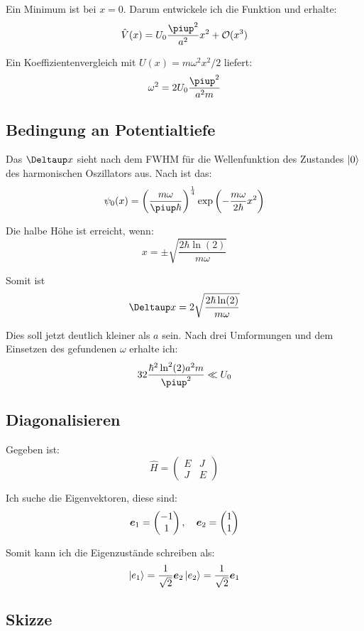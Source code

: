 Ein Minimum ist bei $x = 0$. Darum entwickele ich die Funktion und erhalte:
\[
	\hat V(x) = U_0 \frac{\piup^2}{a^2} x^2 + \mathcal O(x^3)
\]

Ein Koeffizientenvergleich mit $U(x) = m \omega^2 x^2/2$ liefert:
\[
	\omega^2 = 2 U_0 \frac{\piup^2}{a^2m}
\]

\subsection{Bedingung an Potentialtiefe}

Das $\Deltaup x$ sieht nach dem FWHM für die Wellenfunktion des Zustandes $\left| 0 \right\rangle$ des harmonischen Oszillators aus. Nach \cite[Übersichtsfolie 17]{kubis/physik421} ist das:
\[
	\psi_0(x) = \del{\frac{m \omega}{\piup \hbar}}^{\frac 14} \exp\del{-\frac{m\omega}{2\hbar} x^2}
\]

Die halbe Höhe ist erreicht, wenn:
\[
	x = \pm \sqrt{\frac{2\hbar \ln(2)}{m\omega}}
\]

Somit ist
\[
	\Deltaup x = 2 \sqrt{\frac{2\hbar \ln(2)}{m\omega}}
\]

Dies soll jetzt deutlich kleiner als $a$ sein. Nach drei Umformungen und dem
Einsetzen des gefundenen $\omega$ erhalte ich:
\[
	32 \frac{\hbar^2 \ln^2(2) a^2 m}{\piup^2} \ll U_0
\]

\subsection{Diagonalisieren}

Gegeben ist:
\[
	\hat H = \begin{pmatrix}
		E & J \\ J & E
	\end{pmatrix}
\]

Ich suche die Eigenvektoren, diese sind:
\[
	\boldsymbol{e}_1 = \begin{pmatrix}
		-1 \\ 1
	\end{pmatrix}
	,\quad
	\boldsymbol{e}_2 = \begin{pmatrix}
		1 \\ 1
	\end{pmatrix}
\]

Somit kann ich die Eigenzustände schreiben als:
\[
	\left| e_1 \right\rangle = \frac{1}{\sqrt{2}} \boldsymbol{e}_2 \\
	\left| e_2 \right\rangle = \frac{1}{\sqrt{2}} \boldsymbol{e}_1 \\
\]

\subsection{Skizze}

